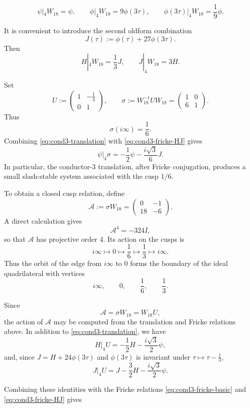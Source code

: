 \documentclass[preprint,12pt]{elsarticle}
\theoremstyle{definition}
\theoremstyle{remark}
\begin{document}
\begin{equation}\label{eq:cond3-fricke-basic}
	\psi|_4W_{18}=\psi,\qquad
	\phi|_4W_{18}=9\phi(3\tau),\qquad
	\phi(3\tau)|_4W_{18}=\frac{1}{9}\phi.
\end{equation}

It is convenient to introduce the second oldform combination
\[
J(\tau):=\phi(\tau)+27\phi(3\tau).
\]
Then
\begin{equation}\label{eq:cond3-fricke-HJ}
	H|_4W_{18}=\frac{1}{3}J,
	\qquad
	J|_4W_{18}=3H.
\end{equation}

Set
\[
U:=
\begin{pmatrix}
	1&-\frac{1}{3}\\
	0&1
\end{pmatrix},
\qquad
\sigma:=W_{18}^{-1}UW_{18}
=
\begin{pmatrix}
	1&0\\
	6&1
\end{pmatrix}.
\]
Thus
\[
\sigma(i\infty)=\frac{1}{6}.
\]
Combining \eqref{eq:cond3-translation} with \eqref{eq:cond3-fricke-HJ} gives
\begin{equation}\label{eq:cond3-sigma}
	\psi|_4\sigma
	=
	-\frac{1}{2}\psi-\frac{i\sqrt{3}}{6}J.
\end{equation}
In particular, the conductor-$3$ translation, after Fricke conjugation, produces a small slash-stable system associated with the cusp $1/6$.

To obtain a closed cusp relation, define
\[
\mathcal A:=\sigma W_{18}
=
\begin{pmatrix}
	0&-1\\
	18&-6
\end{pmatrix}.
\]
A direct calculation gives
\[
\mathcal A^4=-324I,
\]
so that $\mathcal A$ has projective order $4$.  Its action on the cusps is
\[
i\infty\longmapsto0\longmapsto\frac{1}{6}
\longmapsto\frac{1}{3}\longmapsto i\infty.
\]
Thus the orbit of the edge from $i\infty$ to $0$ forms the boundary of the ideal quadrilateral with vertices
\[
i\infty,\qquad 0,\qquad \frac{1}{6},\qquad \frac{1}{3}.
\]

Since
\[
\mathcal A=\sigma W_{18}=W_{18}U,
\]
the action of $\mathcal A$ may be computed from the translation and Fricke
relations above. In addition to \eqref{eq:cond3-translation}, we have
\[
H|_4U=-\frac12H-\frac{i\sqrt3}{2}\psi,
\]
and, since $J=H+24\phi(3\tau)$ and $\phi(3\tau)$ is invariant under
$\tau\mapsto\tau-\frac13$,
\[
J|_4U=J-\frac32H-\frac{i\sqrt3}{2}\psi.
\]

Combining these identities with the Fricke relations
\eqref{eq:cond3-fricke-basic} and \eqref{eq:cond3-fricke-HJ} gives
\end{document}
